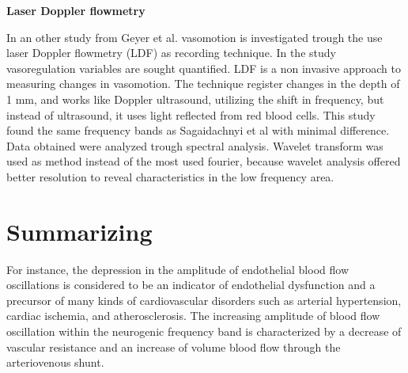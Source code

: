 \textbf{Laser Doppler flowmetry}

In an other study from Geyer et al. vasomotion is investigated trough the use laser Doppler flowmetry (LDF) as recording technique. In the study vasoregulation variables are sought quantified. LDF is a non invasive approach to measuring changes in vasomotion. The technique register changes in the depth of 1 mm, and works like Doppler ultrasound, utilizing the shift in frequency, but instead of ultrasound, it uses light reflected from red blood cells. This study found the same frequency bands as Sagaidachnyi et al with minimal difference. Data obtained were analyzed trough spectral analysis. Wavelet transform was used as method instead of the most used fourier, because wavelet analysis offered better resolution to reveal characteristics in the low frequency area.\cite{Geyer2004}




   

\section{Summarizing}


For instance, the depression in the amplitude of endothelial blood flow oscillations is considered to be an indicator of endothelial dysfunction and a precursor of many kinds of cardiovascular disorders
such as arterial hypertension, cardiac ischemia, and atherosclerosis. The increasing amplitude of blood flow oscillation within the neurogenic frequency band is characterized by a decrease
of vascular resistance and an increase of volume blood flow through the arteriovenous shunt.